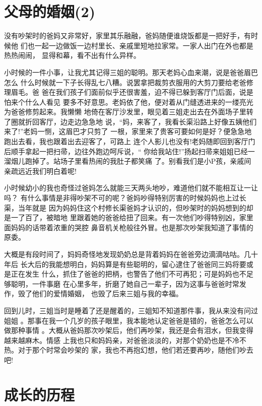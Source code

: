 \documentclass[12pt]{book}
\begin{document}
\section{父母的婚姻(2)}
\label{sec-9-32}

没有吵架时的爸妈又非常好，家里其乐融融，爸妈随便谁烧饭都是一把好手，有时候他
们也一起一边做饭一边村里长、亲戚里短地拉家常。一家人出门在外也都是热热闹闹，
显得和幕，看不出有什么异样。

小时候的一件小事，让我尤其记得三姐的聪明。那天老妈心血来潮，说是爸爸眉巴怎么
什么时候就一下子长得乱七八糟。说罢拿把裁剪衣服用的大剪刀要给老爸修理眉毛。爸
爸在我们孩子们面前似乎还很害羞，迫不得已躲到客厅门后面，说是怕来个什么人看见
要多不好意思。老妈依了他，便对着从门缝透进来的一缕亮光为爸爸修剪起来。我懒懒
地倚在客厅沙发里，眼见着三姐走出去在外面场子里转了圈就折回客厅，边走边急急地
说，“妈，来客了，我看长渠沿路上好像五姨他们来了!”老妈一恻，这眉巴才只剪了
一根，家里来了贵客可要如何是好？便急急地跑出去看，我也跟着出去迎客了，可路上
连个人影儿也没有!老妈随即回到客厅门后顺手拿起一把扫帚，边往外跑边呵斥说，“
你给我站住!”扬起扫帚来姐姐已经一溜烟儿跑掉了。站场子里看热闹的我肚子都笑痛
了。别看我们是小P孩，亲戚间亲疏远近我们明白着呢!

小时候幼小的我也奇怪过爸妈怎么就能三天两头地吵，难道他们就不能相互让一让吗？
有什么事情是非得吵架不可的呢？爸妈吵得特别厉害的时候妈妈也上过长渠，当年就是
因为妈妈住这个村修长渠爸妈才认识的，但吵架时的妈妈想到的却是一了百了，被暗地
里跟着她的爸爸给扭了回来。有一次他们吵得特别凶，家里面妈妈的话带着浓重的哭腔
鼻音机关枪般往外冒。也是那次吵架我知道了事情的原委。

大概是有段时间了，妈妈奇怪地发现奶奶总是背着妈妈在爸爸旁边滴滴咕咕。几十年后
长大后的我能想明白，妈妈算是有些聪明的，留心逮住了爸爸同三妈将要或是正在发生
什么，抓住了爸爸的把柄，也警告了他们不可再犯；可是妈妈也不足够聪明，一件事磨
在心里多年，折磨了她自己一辈子，因为这事与爸爸时常发作，毁了他们的爱情婚姻，
也毁了后来三姐与我的幸福。

回到儿时，三姐当时是睡着了还是醒着的，三姐知不知道那件事，我从来没有问过姐姐
。那事在我一个几岁的孩子眼里，我本能地认定爸爸是错的，爸爸怎么可以做那种事情
。大概从爸妈那次吵架后，他们再吵架，我还是会有泪水，但我变得越来越麻木。情感
上我也只和妈妈亲，对爸爸淡淡的，对那个奶奶也是不冷不热。对于那个时常会吵架的
家，我也不再抱幻想，他们若还要再吵，随他们吵去吧!
\section{成长的历程}
\label{sec-9-33}
\end{document}
